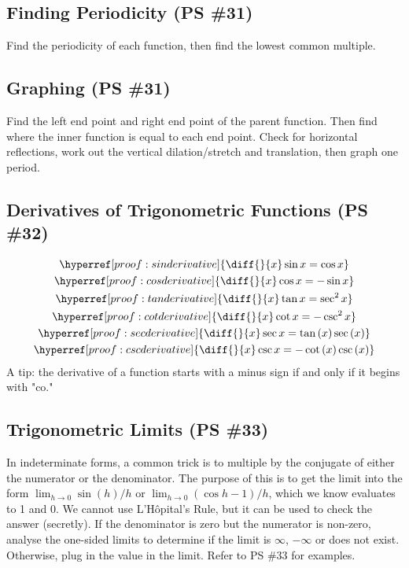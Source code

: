 \documentclass{article}
\begin{document}
\subsection{Finding Periodicity (PS \#31)}
Find the periodicity of each function, then find the lowest
common multiple.

\subsection{Graphing (PS \#31)}
Find the left end point and right end point of the parent function.
Then find where the inner function is equal to each end point.
Check for horizontal reflections, work out the vertical
dilation/stretch and translation, then graph one period.

\subsection{Derivatives of Trigonometric Functions (PS \#32)}
\begin{gather*}
	\hyperref[proof:sinderivative]{
		\diff{}{x}\sin x=\cos x
	} \\
	\hyperref[proof:cosderivative]{
		\diff{}{x}\cos x=-\sin x
	} \\
	\hyperref[proof:tanderivative]{
		\diff{}{x}\tan x=\sec^2x
	} \\
	\hyperref[proof:cotderivative]{
		\diff{}{x}\cot x=-\csc^2x
	} \\
	\hyperref[proof:secderivative]{
		\diff{}{x}\sec x=\tan\left(x\right)\sec\left(x\right)
	} \\
	\hyperref[proof:cscderivative]{
		\diff{}{x}\csc x=-\cot\left(x\right)\csc\left(x\right)
	}
\end{gather*}
A tip: the derivative of a function starts with a minus sign if
and only if it begins with "co."

\subsection{Trigonometric Limits (PS \#33)}
In indeterminate forms, a common trick is to multiple by the
conjugate of either the numerator or the denominator. The purpose
of this is to get the limit into the form $\lim_{h\to0}\sin\left(
h\right)/h$ or $\lim_{h\to0}\left(\cos h-1\right)/h$, which we know
evaluates to 1 and 0. We cannot use L'Hôpital's Rule, but it can be
used to check the answer (secretly). If the denominator is zero but
the numerator is non-zero, analyse the one-sided limits to determine
if the limit is $\infty$, $-\infty$ or does not exist. Otherwise,
plug in the value in the limit. Refer to PS \#33 for examples.
\end{document}
